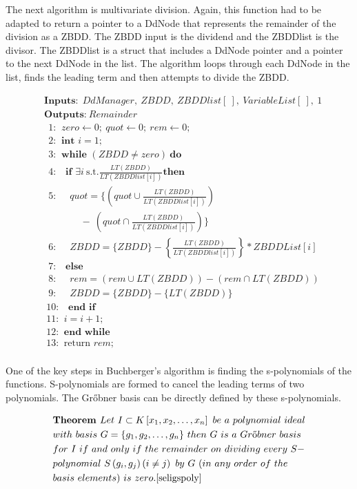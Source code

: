 \documentclass[letterpaper, 10 pt, conference]{ieeeconf}
\begin{document}
The next algorithm is multivariate division.  Again, this function had to be adapted to return a pointer to a DdNode that represents the remainder of the division as a ZBDD.  The ZBDD input is the dividend and the ZBDDlist is the divisor.  The ZBDDlist is a struct that includes a DdNode pointer and a pointer to the next DdNode in the list.  The algorithm loops through each DdNode in the list, finds the leading term and then attempts to divide the ZBDD.
{\small
\begin{align*}
&\textbf{Inputs:}\ \ DdManager,\ ZBDD,\ ZBDDlist[\ ],\ Variable List[\ ],\ 1 \\
&\textbf{Outputs:}\ Remainder \\ 
&\ \ \text{1: }\ zero\leftarrow 0;\ quot\leftarrow 0;\ rem\leftarrow 0; \\
&\ \ \text{2: }\ \textbf{int } i = 1; \\
&\ \ \text{3: }\ \textbf{while } (ZBDD \neq zero)\ \textbf{do} \\
&\ \ \text{4: }\ \ \ \textbf{if } \exists i\ \text{s.t.} \frac{LT(ZBDD)}{LT(ZBDDlist[i])} \textbf{then} \\
&\ \ \text{5: }\ \ \ \ \ quot =\lbrace\left (quot \cup \frac{LT(ZBDD)}{LT(ZBDDlist[i])} \right)\\
&\ \ \ \ \ \ \ \ \ \ \ \ \ \ \ \ \ -\ \left( quot \cap \frac{LT(ZBDD)}{LT(ZBDDlist[i])} \right)\rbrace \\
&\ \ \text{6: }\ \ \ \ \ ZBDD = \{ZBDD\} - \left\lbrace\frac{LT(ZBDD)}{LT(ZBDDlist[i])}\right\rbrace*ZBDDList[i] \\
&\ \ \text{7: }\ \ \ \textbf{else } \\
&\ \ \text{8: }\ \ \ \ \ rem = \left(rem \cup LT(ZBDD)\right) - \left(rem\cap LT(ZBDD)\right) \\
&\ \ \text{9: }\ \ \ \ \ ZBDD = \{ZBDD\} - \{LT(ZBDD)\} \\
&\ \text{10: }\ \ \ \textbf{end if } \\
&\ \text{11: }\ i = i+1; \\
&\ \text{12: }\ \textbf{end  while} \\
&\ \text{13: }\ \text{return } rem; \\
\end{align*}
\par}

One of the key steps in Buchberger's algorithm is finding the s-polynomials of the functions.  S-polynomials are formed to cancel the leading terms of two polynomials.  The Gr{\H o}bner basis can be directly defined by these s-polynomials. 
{\small
\begin{align*}
&\textbf{Theorem } Let\ I \subset K\left[ x_{1},x_{2},\ldots ,x_{n}\right] \ be\ a\ polynomial\ ideal \\ &with\ basis\ G = \{ g_{1},g_{2},\ldots ,g_{n} \} \ then\ G\ is\ a\ Gr\text{{\H o}}bner\ basis \\ 
&for\ I\ if\ and\ only\ if\ the\ remainder\ on\ dividing\ every\ S- \\
&polynomial\ S\left(g_{i},g_{j}\right)\left(i \not= j \right)\ by\ G\ ( in\ any\ order\ of\ the \\ 
&basis\ elements ) \ is\ zero. \cite{seligspoly} 
\end{align*}
\par} 
\end{document}
